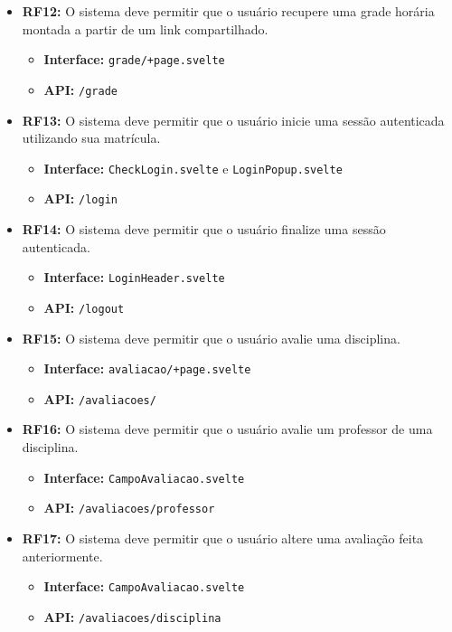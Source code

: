 \begin{itemize}
    \item \textbf{RF12:} O sistema deve permitir que o usuário recupere uma grade horária montada a partir de um link compartilhado.
    \begin{itemize}
        \item \textbf{Interface:} \verb|grade/+page.svelte|
        \item \textbf{API:} \verb|/grade|
    \end{itemize}

    \item \textbf{RF13:} O sistema deve permitir que o usuário inicie uma sessão autenticada utilizando sua matrícula.
    \begin{itemize}
        \item \textbf{Interface:} \verb|CheckLogin.svelte| e \verb|LoginPopup.svelte|
        \item \textbf{API:} \verb|/login|
    \end{itemize}

    \item \textbf{RF14:} O sistema deve permitir que o usuário finalize uma sessão autenticada.
    \begin{itemize}
        \item \textbf{Interface:} \verb|LoginHeader.svelte|
        \item \textbf{API:} \verb|/logout|
    \end{itemize}

    \item \textbf{RF15:} O sistema deve permitir que o usuário avalie uma disciplina.
    \begin{itemize}
        \item \textbf{Interface:} \verb|avaliacao/+page.svelte|
        \item \textbf{API:} \verb|/avaliacoes/|
    \end{itemize}

    \item \textbf{RF16:} O sistema deve permitir que o usuário avalie um professor de uma disciplina.
    \begin{itemize}
        \item \textbf{Interface:} \verb|CampoAvaliacao.svelte|
        \item \textbf{API:} \verb|/avaliacoes/professor| 
    \end{itemize}

    \item \textbf{RF17:} O sistema deve permitir que o usuário altere uma avaliação feita anteriormente.
    \begin{itemize}
        \item \textbf{Interface:} \verb|CampoAvaliacao.svelte|
        \item \textbf{API:} \verb|/avaliacoes/disciplina| 
    \end{itemize}
\end{itemize}

